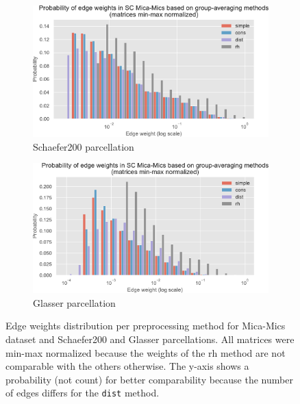 \begin{figure}[p]
\begin{subfigure}{\textwidth}
      \begin{center}
    \includegraphics[width=\textwidth]{images/nootebook_generated/sc_comparison/schaefer/5/0.25/Probability_of_edge_weights_in_SC_Mica-Mics_based_on_group-averaging_methods_(matrices_min-max_normalized).pdf}
  \end{center}
  \caption{Schaefer200 parcellation}
  \label{fig:edge_weights_schaefer}
\end{subfigure}

\bigskip

\begin{subfigure}{\textwidth}
      \begin{center}
    \includegraphics[width=\textwidth]{images/nootebook_generated/sc_comparison/MNI-HCP-MMP1/5/0.25/Probability_of_edge_weights_in_SC_Mica-Mics_based_on_group-averaging_methods_(matrices_min-max_normalized).pdf}
  \end{center}
  \caption{Glasser parcellation}
  \label{fig:edge_weights_glasser}
\end{subfigure}
\caption[Edge weights distribution per preprocessing method]{Edge weights distribution per preprocessing method for Mica-Mics dataset and Schaefer200 and Glasser parcellations. All matrices were min-max normalized because the weights of the rh method are not comparable with the others otherwise. The y-axis shows a probability (not count) for better comparability because the number of edges differs for the \texttt{dist} method.}
\end{figure}

